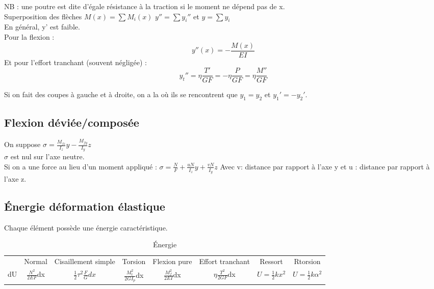 \documentclass[../main.tex]{subfiles}
\begin{document}
NB : une poutre est dite d'égale résistance à la traction si le moment ne dépend pas de x.\\

Superposition des flèches $M(x) = \sum M_i(x)$ $y'' = \sum y_i''$ et $y=\sum y_i$\\
En général, y' est faible.\\

Pour la flexion : \\
\begin{equation}
    y''(x) = -\frac{M(x)}{EI}
\end{equation}
Et pour l'effort tranchant (souvent négligée) :\\
\begin{equation}
    y_t'' = \eta \frac{T'}{GF} = -\eta \frac{P}{GF} = \eta \frac{M''}{GF}
\end{equation}

\warning Si on fait des coupes à gauche et à droite, on a la où ils se rencontrent que $y_1 = y_2$ et $y_1' = -y_2'$.\\

\subsection{Flexion déviée/composée}
On suppose $\sigma = \frac{M_{fz}}{I_z} y - \frac{M_{fy}}{I_y} z$\\
\warning $\sigma$ est nul sur l'axe neutre.\\
Si on a une force au lieu d'un moment appliqué : $\sigma = \frac{N}{F} + \frac{u N}{I_z}y + \frac{v N}{I_y}z$ Avec v: distance par rapport à l'axe y et u : distance par rapport à l'axe z.\\

\subsection{Énergie déformation élastique}
Chaque élément possède une énergie caractéristique.\\

\begin{table}[hbt!]
    \centering
    \begin{tabular}{||c|c|c|c|c|c|c|c|}
        \hline
         & Normal & Cisaillement simple & Torsion & Flexion pure & Effort tranchant & Ressort &  Rtorsion \\
        dU & $\frac{N^2}{2EF}$dx & $\frac{1}{2}\tau^2 \frac{F}{G}dx$ & $\frac{M_t^2}{2GI_p}$dx&$\frac{M_f^2}{2EI}$dx & $\eta \frac{T^2}{2GF}$dx & $U = \frac{1}{2}kx^2$ & $U = \frac{1}{2} k \alpha^2$\\
        \hline
     \end{tabular}
    \caption{Énergie}
\end{table}
\end{document}
